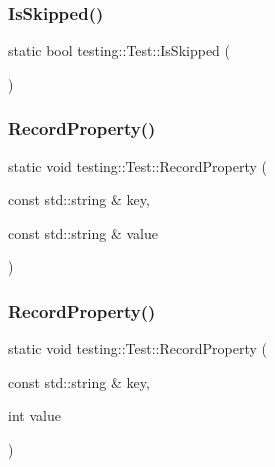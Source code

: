\subsubsection{\texorpdfstring{Is\+Skipped()}{IsSkipped()}}
{\footnotesize\ttfamily static bool testing\+::\+Test\+::\+Is\+Skipped (\begin{DoxyParamCaption}{ }\end{DoxyParamCaption})\hspace{0.3cm}{\ttfamily [static]}}

\mbox{\label{classtesting_1_1Test_ae0448aec9e389fab70f6a75a59ff6aa2}} 
\subsubsection{\texorpdfstring{Record\+Property()}{RecordProperty()}\hspace{0.1cm}{\footnotesize\ttfamily [1/2]}}
{\footnotesize\ttfamily static void testing\+::\+Test\+::\+Record\+Property (\begin{DoxyParamCaption}\item[{const std\+::string \&}]{key,  }\item[{const std\+::string \&}]{value }\end{DoxyParamCaption})\hspace{0.3cm}{\ttfamily [static]}}

\mbox{\label{classtesting_1_1Test_af602903efb17730b977304fc56500881}} 
\subsubsection{\texorpdfstring{Record\+Property()}{RecordProperty()}\hspace{0.1cm}{\footnotesize\ttfamily [2/2]}}
{\footnotesize\ttfamily static void testing\+::\+Test\+::\+Record\+Property (\begin{DoxyParamCaption}\item[{const std\+::string \&}]{key,  }\item[{int}]{value }\end{DoxyParamCaption})\hspace{0.3cm}{\ttfamily [static]}}

